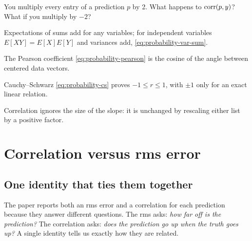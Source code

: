 \begin{checkpoint}
You multiply every entry of a prediction $p$ by 2. What happens to $\mathrm{corr}(p,y)$? What if you multiply by $-2$?
\end{checkpoint}

\begin{keyideas}

\item Expectations of sums add for any variables; for independent variables $E[XY]=E[X]E[Y]$ and variances add, \cref{eq:probability-var-sum}.
\item The Pearson coefficient \cref{eq:probability-pearson} is the cosine of the angle between centered data vectors.
\item Cauchy--Schwarz \cref{eq:probability-cs} proves $-1\le r\le 1$, with $\pm1$ only for an exact linear relation.
\item Correlation ignores the size of the slope: it is unchanged by rescaling either list by a positive factor.

\end{keyideas}

\section{Correlation versus rms error}\label{sec:probability-corr-rms}

\subsection{One identity that ties them together}

The paper reports both an rms error and a correlation for each prediction because they answer different questions. The rms asks: \emph{how far off is the prediction?} The correlation asks: \emph{does the prediction go up when the truth goes up?} A single identity tells us exactly how they are related.

